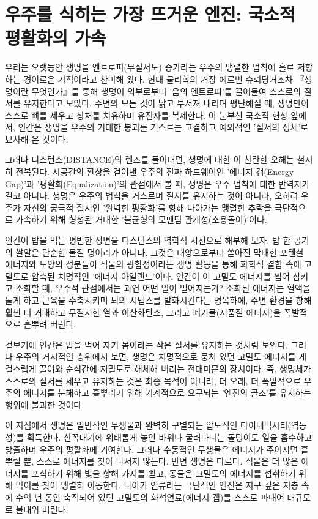 

\section{우주를 식히는 가장 뜨거운 엔진: 국소적 평활화의 가속}
우리는 오랫동안 생명을 엔트로피(무질서도) 증가라는 우주의 맹렬한 법칙에 홀로 저항하는 경이로운 기적이라고 찬미해 왔다. 현대 물리학의 거장 에르빈 슈뢰딩거조차 『생명이란 무엇인가』를 통해 생명이 외부로부터 '음의 엔트로피'를 끌어들여 스스로의 질서를 유지한다고 보았다. 주변의 모든 것이 낡고 부서져 내리며 평탄해질 때, 생명만이 스스로 뼈를 세우고 상처를 치유하며 유전자를 복제한다. 이 눈부신 국소적 현상 앞에서, 인간은 생명을 우주의 거대한 붕괴를 거스르는 고결하고 예외적인 '질서의 성채'로 묘사해 온 것이다. 

그러나 디스턴스(DISTANCE)의 렌즈를 들이대면, 생명에 대한 이 찬란한 오해는 철저히 전복된다. 시공간의 환상을 걷어낸 우주의 진짜 하드웨어인 '에너지 갭(Energy Gap)'과 '평활화(Equalization)'의 관점에서 볼 때, 생명은 우주 법칙에 대한 반역자가 결코 아니다. 생명은 우주의 법칙을 거스르며 질서를 유지하는 것이 아니라, 오히려 우주가 자신의 궁극적 질서인 '완벽한 평활화'를 향해 나아가는 맹렬한 추락을 극단적으로 가속하기 위해 형성된 거대한 '불균형의 모멘텀 관계성(소용돌이)'이다. 

인간이 밥을 먹는 평범한 장면을 디스턴스의 역학적 시선으로 해부해 보자. 밥 한 공기의 쌀알은 단순한 물질 덩어리가 아니다. 그것은 태양으로부터 쏟아진 막대한 포텐셜 에너지와 토양의 성분들이 식물의 광합성이라는 생명 활동을 통해 화학적 결합 속에 고밀도로 압축된 치명적인 '에너지 아일랜드'이다. 인간이 이 고밀도 에너지를 씹어 삼키고 소화할 때, 우주적 관점에서는 과연 어떤 일이 벌어지는가? 소화된 에너지는 혈액을 돌게 하고 근육을 수축시키며 뇌의 시냅스를 발화시킨다는 명목하에, 주변 환경을 향해 훨씬 더 거대하고 무질서한 열과 이산화탄소, 그리고 폐기물(저품질 에너지)을 폭발적으로 흩뿌려 버린다.

겉보기에 인간은 밥을 먹어 자기 몸이라는 작은 질서를 유지하는 것처럼 보인다. 그러나 우주의 거시적인 층위에서 보면, 생명은 치명적으로 뭉쳐 있던 고밀도 에너지를 게걸스럽게 끌어와 순식간에 저밀도로 해체해 버리는 전대미문의 장치이다. 즉, 생명체가 스스로의 질서를 세우고 유지하는 것은 최종 목적이 아니라, 더 오래, 더 폭발적으로 우주의 에너지를 분해하고 흩뿌리기 위해 기계적으로 요구되는 '엔진의 골조'를 유지하는 행위에 불과한 것이다.

이 지점에서 생명은 일반적인 무생물과 완벽히 구별되는 압도적인 다이내믹시티(역동성)를 획득한다. 산꼭대기에 위태롭게 놓인 바위나 굴러다니는 돌덩이도 열을 흡수하고 방출하며 우주의 평활화에 기여한다. 그러나 수동적인 무생물은 에너지가 주어지면 흩뿌릴 뿐, 스스로 에너지를 찾아 나서지 않는다. 반면 생명은 다르다. 식물은 더 많은 에너지를 포식하기 위해 빛을 향해 가지를 뻗고, 동물은 고밀도의 에너지를 섭취하기 위해 먹이를 찾아 맹렬히 이동한다. 나아가 인류라는 극단적인 엔진은 지구 깊은 지층 속에 수억 년 동안 축적되어 있던 고밀도의 화석연료(에너지 갭)를 스스로 파내어 대규모로 불태워 버린다.

